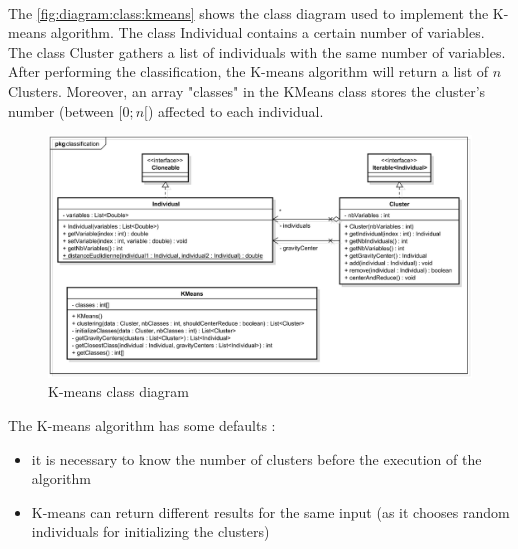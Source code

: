 ~~

The \vref{fig:diagram:class:kmeans} shows the class diagram used to implement the K-means \gls{algorithm}. The class Individual contains a certain number of variables. The class Cluster gathers a list of individuals with the same number of variables. After performing the classification, the K-means \gls{algorithm} will return a list of $n$ Clusters. Moreover, an array "classes" in the KMeans class stores the \gls{cluster}'s number (between $[0;n[$) affected to each \gls{individual}.


\begin{figure}[h]
	\centering 
	\includegraphics[width=1\textwidth]{images/diagrams/class_diagram_kmeans}
	\caption{K-means class diagram}
	\label{fig:diagram:class:kmeans}
\end{figure}



The K-means \gls{algorithm} has some defaults : 
\begin{itemize}
	\item it is necessary to know the number of clusters before the execution of the \gls{algorithm}
	\item K-means can return different results for the same input (as it chooses random \glspl{individual} for initializing the \glspl{cluster})
\end{itemize}





